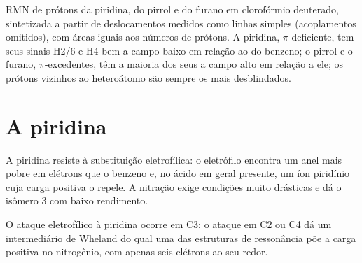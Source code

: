 \begin{omfigure}

{\small RMN de prótons da piridina, do pirrol e do furano em clorofórmio deuterado,
sintetizada a partir de deslocamentos medidos como linhas simples (acoplamentos omitidos), com
áreas iguais aos números de prótons. A piridina, $\pi$-deficiente, tem seus sinais H2/6 e H4
bem a campo baixo em relação ao do benzeno; o pirrol e o furano, $\pi$-excedentes, têm a maioria
dos seus a campo alto em relação a ele; os prótons vizinhos ao heteroátomo são sempre os mais
desblindados.}
\end{omfigure}

\section{A piridina}

A piridina resiste à substituição eletrofílica: o eletrófilo encontra um anel
mais pobre em elétrons que o benzeno e, no ácido em geral presente, um
íon piridínio cuja carga positiva o repele. A nitração exige condições muito
drásticas e dá o isômero 3 com baixo rendimento.

\begin{proposition}\label{prop:b3:heterocycles:pyridine-c3}
O ataque eletrofílico à piridina ocorre em C3: o ataque em C2 ou C4 dá um
intermediário de Wheland do qual uma das estruturas de ressonância põe a carga positiva
no nitrogênio, com apenas seis elétrons ao seu redor.
\end{proposition}

